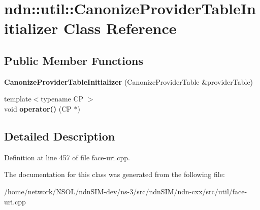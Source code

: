 \hypertarget{classndn_1_1util_1_1CanonizeProviderTableInitializer}{}\section{ndn\+:\+:util\+:\+:Canonize\+Provider\+Table\+Initializer Class Reference}
\label{classndn_1_1util_1_1CanonizeProviderTableInitializer}
\subsection*{Public Member Functions}
\begin{DoxyCompactItemize}
\item 
{\bfseries Canonize\+Provider\+Table\+Initializer} (Canonize\+Provider\+Table \&provider\+Table)\hypertarget{classndn_1_1util_1_1CanonizeProviderTableInitializer_a0543dc995ec47f01971edad4df511311}{}\label{classndn_1_1util_1_1CanonizeProviderTableInitializer_a0543dc995ec47f01971edad4df511311}

\item 
{\footnotesize template$<$typename CP $>$ }\\void {\bfseries operator()} (CP $\ast$)\hypertarget{classndn_1_1util_1_1CanonizeProviderTableInitializer_a33f2dc969f6a6b625e2a4a73b7cb7297}{}\label{classndn_1_1util_1_1CanonizeProviderTableInitializer_a33f2dc969f6a6b625e2a4a73b7cb7297}

\end{DoxyCompactItemize}


\subsection{Detailed Description}


Definition at line 457 of file face-\/uri.\+cpp.



The documentation for this class was generated from the following file\+:\begin{DoxyCompactItemize}
\item 
/home/network/\+N\+S\+O\+L/ndn\+S\+I\+M-\/dev/ns-\/3/src/ndn\+S\+I\+M/ndn-\/cxx/src/util/face-\/uri.\+cpp\end{DoxyCompactItemize}
